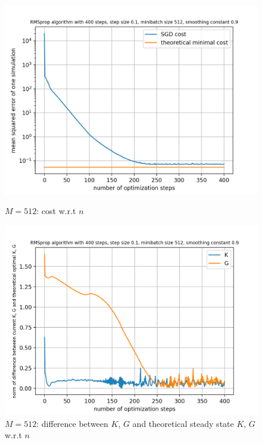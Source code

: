\documentclass{article}
\begin{document}
\begin{figure}[h!]
	\centering
	\begin{minipage}[t]{.28\paperwidth}
		\centering
		\includegraphics[width=1.0\textwidth]{Figures/M512.png}
		\caption{$M=512$: cost w.r.t $n$}
	\end{minipage}%
	\begin{minipage}[t]{.28\paperwidth}
		\centering
		\includegraphics[width=1.0\textwidth]{Figures/d_M512.png}
		\caption{$M=512$: difference between $K$, $G$ and theoretical steady state $K$, $G$ w.r.t $n$}
	\end{minipage}%
	\begin{minipage}[t]{.28\paperwidth}
		\centering

\end{minipage}
\end{figure}
\end{document}
